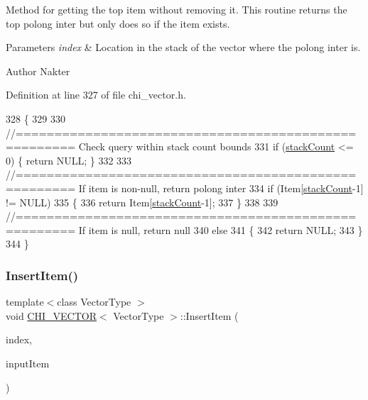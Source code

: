 Method for getting the top item without removing it. This routine returns the top polong inter but only does so if the item exists.


\begin{DoxyParams}{Parameters}
{\em index} & Location in the stack of the vector where the polong inter is.\\
\hline
\end{DoxyParams}
\begin{DoxyAuthor}{Author}
Nakter 
\end{DoxyAuthor}


Definition at line 327 of file chi\+\_\+vector.\+h.


\begin{DoxyCode}
328 \{
329 
330     \textcolor{comment}{//===================================================== Check query within stack count bounds}
331     \textcolor{keywordflow}{if} (\hyperlink{class_c_h_i___v_e_c_t_o_r_a91ef30712b0ead293dfe1adc29fee555}{stackCount} <= 0) \{ \textcolor{keywordflow}{return} NULL; \}
332 
333     \textcolor{comment}{//===================================================== If item is non-null, return polong inter}
334     \textcolor{keywordflow}{if} (Item[\hyperlink{class_c_h_i___v_e_c_t_o_r_a91ef30712b0ead293dfe1adc29fee555}{stackCount}-1] != NULL)
335     \{
336         \textcolor{keywordflow}{return} Item[\hyperlink{class_c_h_i___v_e_c_t_o_r_a91ef30712b0ead293dfe1adc29fee555}{stackCount}-1];
337     \}
338 
339     \textcolor{comment}{//===================================================== If item is null, return null}
340     \textcolor{keywordflow}{else}
341     \{
342         \textcolor{keywordflow}{return} NULL;
343     \}
344 \}
\end{DoxyCode}
\mbox{\label{class_c_h_i___v_e_c_t_o_r_ae0c82697e82c997505baf414d13f31f2_ae0c82697e82c997505baf414d13f31f2}} 
\subsubsection{\texorpdfstring{Insert\+Item()}{InsertItem()}}
{\footnotesize\ttfamily template$<$class Vector\+Type $>$ \\
void \hyperlink{class_c_h_i___v_e_c_t_o_r}{C\+H\+I\+\_\+\+V\+E\+C\+T\+OR}$<$ Vector\+Type $>$\+::Insert\+Item (\begin{DoxyParamCaption}\item[{long int}]{index,  }\item[{Vector\+Type\+Ptr}]{input\+Item }\end{DoxyParamCaption})}

